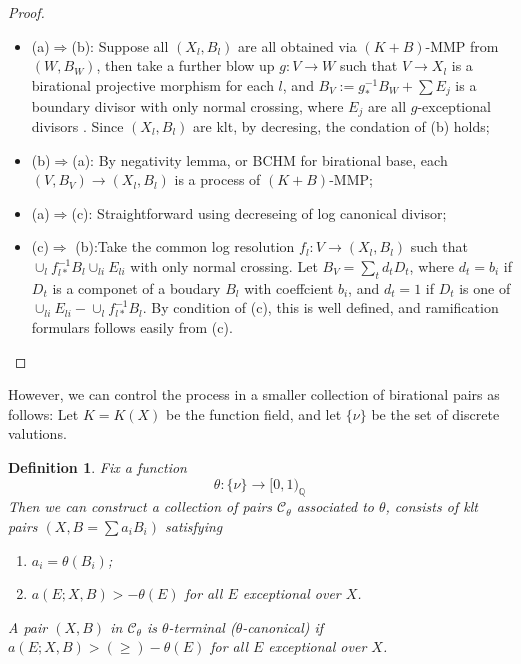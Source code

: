 \documentclass{article}
\newtheorem{defn}{Definition}[section]
\begin{document}
\begin{proof}
  \begin{itemize}
    \item (a)$ \Rightarrow $(b): Suppose all $ (X_l,B_l) $ are all obtained via $ (K+B) $-MMP from $ (W,B_W) $, then take a further blow up $ g:V\to W $ such that $ V\to X_l $ is a birational projective morphism for each $ l $, and $ B_V:=g^{-1}_*B_W+\sum E_j $ is a boundary divisor with only normal crossing, where $ E_j $ are all {\tiny }$ g $-exceptional divisors . Since $ (X_l,B_l) $ are klt, by decresing, the condation of (b) holds;
    \item (b)$ \Rightarrow $(a): By negativity lemma, or BCHM for birational base, each $ (V,B_V)\to (X_l,B_l) $ is a process of $ (K+B) $-MMP;
    \item (a)$ \Rightarrow $(c): Straightforward using decreseing of log canonical divisor;
    \item (c)$ \Rightarrow $ (b):Take the common log resolution $ f_l:V\to (X_l,B_l) $ such that $ \cup_lf_{l*}^{-1}B_l\cup_{li}E_{li} $ with only normal crossing. Let $ B_V=\sum_td_tD_t $, where $ d_t=b_i $ if $ D_t $ is a componet of a boudary $ B_l $ with coeffcient $ b_i $, and $ d_t=1 $ if $ D_t $ is one of $ \cup_{li}E_{li}-\cup_lf_{l*}^{-1}B_l $. By condition of (c), this is well defined, and ramification formulars follows easily from (c).
  \end{itemize}
\end{proof}

However, we can control the process in a smaller collection of birational pairs as follows: Let $ K=K(X) $ be the function field, and let $ \{\nu\} $ be the set of discrete valutions. 
\begin{defn}
  Fix a function 
  $$ \theta:\{\nu\}\to [0,1)_\mathbb{Q} $$
  Then we can construct a collection of pairs $ \mathcal{C}_\theta $ associated to $ \theta $, consists of klt pairs $ (X,B=\sum a_iB_i) $ satisfying
  \begin{enumerate}
    \item $ a_i=\theta(B_i) $;
    \item $ a(E;X,B)>-\theta(E) $ for all $ E $ exceptional over $ X $.
  \end{enumerate} 
A pair $ (X,B) $ in $ \mathcal{C}_\theta $ is $ \theta $-terminal ($ \theta $-canonical) if $ a(E;X,B)>(\geqslant)-\theta(E) $ for all $ E $ exceptional over $ X $.
\end{defn}
\end{document}
